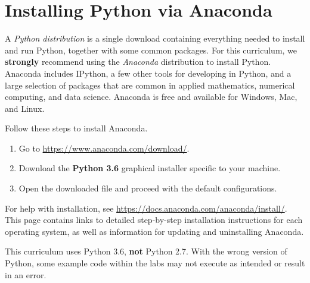 \label{pythoninstall}


\section*{Installing Python via Anaconda} %




A \emph{Python distribution} is a single download containing everything needed to install and run Python, together with some common packages.
For this curriculum, we \textbf{strongly} recommend using the \emph{Anaconda} distribution to install Python.
Anaconda includes IPython, a few other tools for developing in Python, and a large selection of packages that are common in applied mathematics, numerical computing, and data science.
Anaconda is free and available for Windows, Mac, and Linux.

Follow these steps to install Anaconda.
\begin{enumerate}
\item Go to \url{https://www.anaconda.com/download/}.
\item Download the \textbf{Python 3.6} graphical installer specific to your machine.
\item Open the downloaded file and proceed with the default configurations.
\end{enumerate}

For help with installation, see \url{https://docs.anaconda.com/anaconda/install/}.
This page contains links to detailed step-by-step installation instructions for each operating system, as well as information for updating and uninstalling Anaconda.

\begin{warn}
This curriculum uses Python 3.6, \textbf{not} Python 2.7.
With the wrong version of Python, some example code within the labs may not execute as intended or result in an error.
\end{warn}

